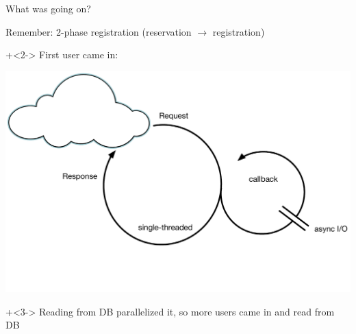 \begin{frame}[fragile]{What was going on?}

\renewcommand{\SPACE}{.6em}

Remember: 2-phase registration (reservation $\rightarrow$ registration)
\vspace{\SPACE}

\onslide+<2->
First user came in:
\vspace{\SPACE}

\includegraphics[width=.5\textwidth]{../Nodejs3.pdf}

\onslide+<3->
Reading from DB parallelized it, so more users came in and read from DB

\end{frame}

